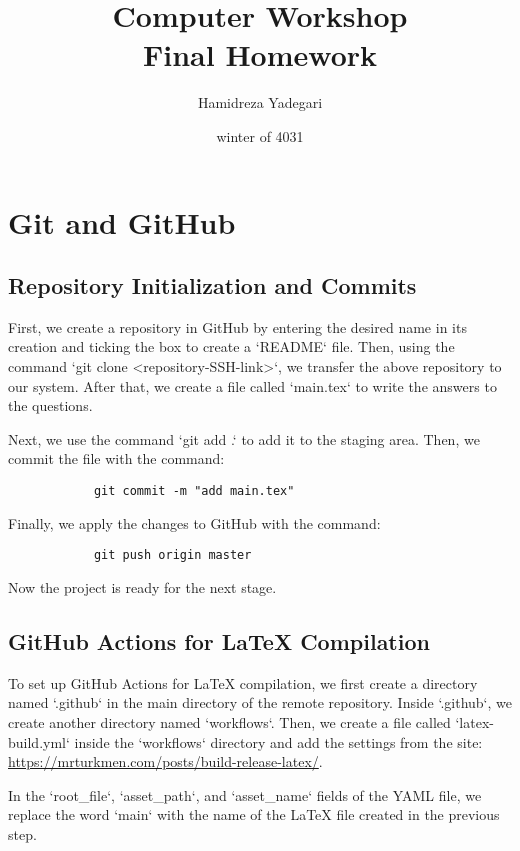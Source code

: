 \documentclass{article}
\title{Computer Workshop \\ Final Homework}
\author{Hamidreza Yadegari}
\date{winter of 4031}
\begin{document}
\maketitle 
\thispagestyle{empty}
\newpage

\tableofcontents
{}
\setcounter{page}{1}
\newpage

\section{Git and GitHub}
    \subsection{Repository Initialization and Commits}
        First, we create a repository in GitHub by entering the desired name in its creation and ticking the box to create a `README` file. Then, using the command `git clone <repository-SSH-link>`, we transfer the above repository to our system. After that, we create a file called `main.tex` to write the answers to the questions. 

        Next, we use the command `git add .` to add it to the staging area. Then, we commit the file with the command:
        \begin{verbatim}
            git commit -m "add main.tex"
        \end{verbatim}
            Finally, we apply the changes to GitHub with the command:
        \begin{verbatim}
            git push origin master
        \end{verbatim}
        Now the project is ready for the next stage.
        \\
        \subsection{GitHub Actions for LaTeX Compilation}
            To set up GitHub Actions for LaTeX compilation, we first create a directory named `.github` in the main directory of the remote repository. Inside `.github`, we create another directory named `workflows`. Then, we create a file called `latex-build.yml` inside the `workflows` directory and add the settings from the site:
            \url{https://mrturkmen.com/posts/build-release-latex/}.
            
            In the `root\_file`, `asset\_path`, and `asset\_name` fields of the YAML file, we replace the word `main` with the name of the LaTeX file created in the previous step. 
            
\end{document}
